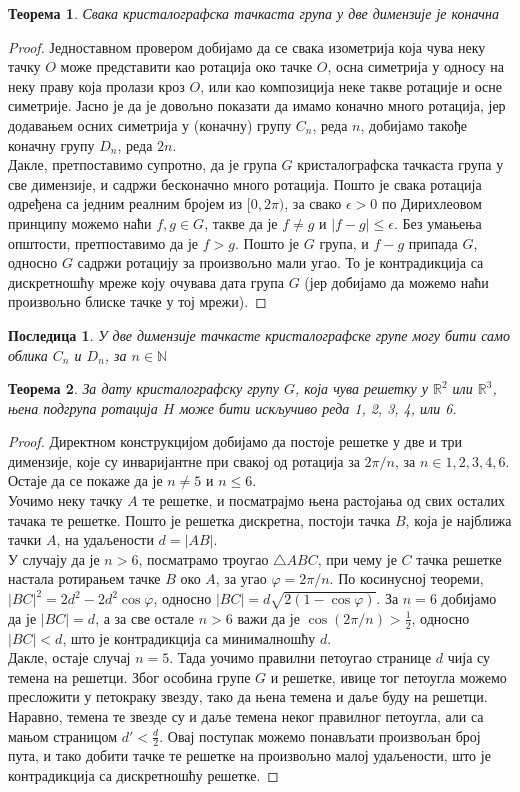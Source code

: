 \documentclass{report}
\theoremstyle{plain}
\newtheorem{thm}{Теорема}
\newtheorem{cor}{Последица}
\theoremstyle{definition}
\begin{document}
\begin{thm}
Свака кристалографска тачкаста група у две димензије је коначна
\end{thm}
\begin{proof}
Једноставном провером добијамо да се свака изометрија која чува неку тачку $O$ може представити као ротација око тачке $O$, осна симетрија у односу на неку праву која пролази кроз $O$, или као композиција неке такве ротације и осне симетрије. Јасно је да је довољно показати да имамо коначно много ротација, јер додавањем осних симетрија у (коначну) групу $C_n$, реда $n$, добијамо такође коначну групу $D_n$, реда $2n$.\\
Дакле, претпоставимо супротно, да је група $G$ кристалографска тачкаста група у све димензије, и садржи бесконачно много ротација. Пошто је свака ротација одређена са једним реалним бројем из $[0,2\pi)$, за свако $\epsilon>0$ по Дирихлеовом принципу можемо наћи $f, g\in G$, такве да је $f\neq g$ и $|f-g|\leq\epsilon$. Без умањења општости, претпоставимо да је $f>g$. Пошто је $G$ група, и $f-g$ припада $G$, односно $G$ садржи ротацију за произвољно мали угао. То је контрадикција са дискретношћу мреже коју очувава дата група $G$ (јер добијамо да можемо наћи произвољно блиске тачке у тој мрежи).
\end{proof}
\begin{cor}
У две димензије тачкасте кристалографске групе могу бити само облика $C_n$ и $D_n$, за $n\in\mathbb{N}$
\end{cor}

\begin{thm}
За дату кристалографску групу $G$, која чува решетку у $\mathbb{R}^2$ или $\mathbb{R}^3$, њена подгрупа ротација $H$ може бити искључиво реда 1, 2, 3, 4, или 6.
\end{thm}
\begin{proof}
Директном конструкцијом добијамо да постоје решетке у две и три димензије, које су инваријантне при свакој од ротација за $2\pi/n$, за $n\in{1, 2, 3, 4, 6}$. Остаје да се покаже да је $n\neq 5$ и $n\leq 6$.\\
Уочимо неку тачку $A$ те решетке, и посматрајмо њена растојања од свих осталих тачака те решетке. Пошто је решетка дискретна, постоји тачка $B$, која је најближа тачки $A$, на удаљености $d = |AB|$.\\
У случају да је $n>6$, посматрамо троугао $\triangle ABC$, при чему је $C$ тачка решетке настала ротирањем тачке $B$ око $A$, за угао $\varphi = 2\pi/n$. По косинусној теореми, $|BC|^2 = 2 d^2-2 d^2 \cos\varphi$, односно $|BC| = d\sqrt{2(1-\cos\varphi)}$. За $n=6$ добијамо да је $|BC| = d$, а за све остале $n>6$ важи да је $\cos(2\pi/n)>\frac12$, односно $|BC|<d$, што је контрадикција са минималношћу $d$.\\
Дакле, остаје случај $n=5$. Тада уочимо правилни петоугао странице $d$ чија су темена на решетци. Због особина групе $G$ и решетке, ивице тог петоугла можемо пресложити у петокраку звезду, тако да њена темена и даље буду на решетци. Наравно, темена те звезде су и даље темена неког правилног петоугла, али са мањом страницом $d'<\frac d 2$. Овај поступак можемо понављати произвољан број пута, и тако добити тачке те решетке на произвољно малој удаљености, што је контрадикција са дискретношћу решетке.
\end{proof}
\end{document}
